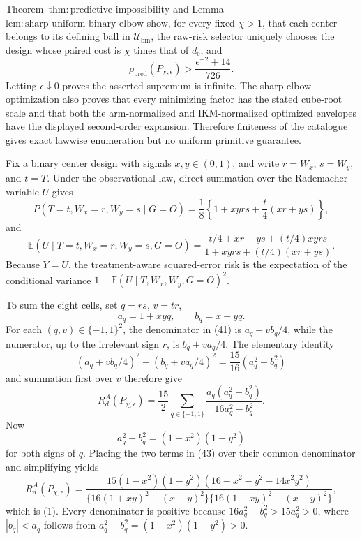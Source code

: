 Theorem~\(\mathrm{thm{:}predictive\text{-}impossibility}\) and Lemma~\(\mathrm{lem{:}sharp\text{-}uniform\text{-}binary\text{-}elbow}\) show, for every fixed \(\chi>1\), that each center belongs to its defining ball in \(\mathcal U_{\mathrm{bin}}\), the raw-risk selector uniquely chooses the design whose paired cost is \(\chi\) times that of \(d_{\mathrm e}\), and
\[
 \rho_{\mathrm{pred}}(P_{\chi,\epsilon})
 >\frac{\epsilon^{-2}+14}{726}.
\]
Letting \(\epsilon\downarrow0\) proves the asserted supremum is infinite.  The sharp-elbow optimization also proves that every minimizing factor has the stated cube-root scale and that both the arm-normalized and IKM-normalized optimized envelopes have the displayed second-order expansion.  Therefore finiteness of the catalogue gives exact lawwise enumeration but no uniform primitive guarantee.

Fix a binary center design with signals \(x,y\in(0,1)\), and write \(r=W_x\), \(s=W_y\), and \(t=T\).  Under the observational law, direct summation over the Rademacher variable \(U\) gives
\[
 P(T=t,W_x=r,W_y=s\mid G=O)
 =\frac18\left\{1+xyrs+\frac t4(xr+ys)\right\},           \tag{40}
\]
and
\[
 \mathbb E(U\mid T=t,W_x=r,W_y=s,G=O)
 =\frac{t/4+xr+ys+(t/4)xyrs}
 {1+xyrs+(t/4)(xr+ys)}.                                   \tag{41}
\]
Because \(Y=U\), the treatment-aware squared-error risk is the expectation of the conditional variance \(1-\mathbb E(U\mid T,W_x,W_y,G=O)^2\).

To sum the eight cells, set \(q=rs\), \(v=tr\),
\[
 a_q=1+xyq,
 \qquad b_q=x+yq.
\]
For each \((q,v)\in\{-1,1\}^2\), the denominator in (41) is \(a_q+vb_q/4\), while the numerator, up to the irrelevant sign \(r\), is \(b_q+va_q/4\).  The elementary identity
\[
 (a_q+vb_q/4)^2-(b_q+va_q/4)^2
 =\frac{15}{16}(a_q^2-b_q^2)                              \tag{42}
\]
and summation first over \(v\) therefore give
\[
 R_d^A(P_{\chi,\epsilon})
 =\frac{15}{2}\sum_{q\in\{-1,1\}}
 \frac{a_q(a_q^2-b_q^2)}{16a_q^2-b_q^2}.                 \tag{43}
\]
Now
\[
 a_q^2-b_q^2=(1-x^2)(1-y^2)
\]
for both signs of \(q\).  Placing the two terms in (43) over their common denominator and simplifying yields
\[
 R_d^A(P_{\chi,\epsilon})
 =\frac{15(1-x^2)(1-y^2)(16-x^2-y^2-14x^2y^2)}
 {\{16(1+xy)^2-(x+y)^2\}\{16(1-xy)^2-(x-y)^2\}},
\]
which is (1).  Every denominator is positive because \(16a_q^2-b_q^2>15a_q^2>0\), where \(|b_q|<a_q\) follows from \(a_q^2-b_q^2=(1-x^2)(1-y^2)>0\).

